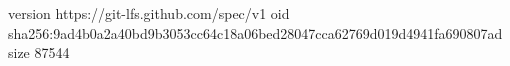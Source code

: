 version https://git-lfs.github.com/spec/v1
oid sha256:9ad4b0a2a40bd9b3053cc64c18a06bed28047cca62769d019d4941fa690807ad
size 87544
